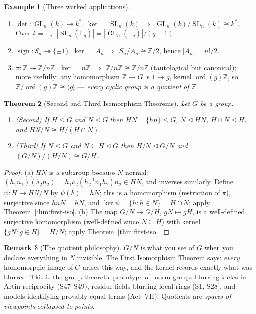 \documentclass[11pt,a4paper]{article}
\newtheorem{theorem}{Theorem}[section]
\theoremstyle{definition}
\newtheorem{example}[theorem]{Example}
\newtheorem{remark}[theorem]{Remark}
\newcommand{\Z}{\mathbb{Z}}
\newcommand{\F}{\mathbb{F}}
\newcommand{\GL}{\operatorname{GL}}
\newcommand{\SL}{\operatorname{SL}}
\newcommand{\ord}{\operatorname{ord}}
\begin{document}
	\begin{example}[Three worked applications]\label{ex:first-iso}
		\begin{enumerate}[label=(\roman*)]
			\item $\det:\GL_n(k)\twoheadrightarrow k^*$, $\ker=\SL_n(k)$ $\Rightarrow$
			$\GL_n(k)/\SL_n(k)\cong k^*$. Over $k=\F_q$: $|\SL_n(\F_q)|=|\GL_n(\F_q)|/(q-1)$.
			\item $\operatorname{sign}:S_n\twoheadrightarrow\{\pm1\}$, $\ker=A_n$ $\Rightarrow$
			$S_n/A_n\cong\Z/2$, hence $|A_n|=n!/2$.
			\item $\pi:\Z\twoheadrightarrow\Z/n\Z$, $\ker=n\Z$ $\Rightarrow$ $\Z/n\Z\cong\Z/n\Z$ (tautological but
			canonical); more usefully: any homomorphism $\Z\to G$ is $1\mapsto g$, kernel $\ord(g)\Z$, so
			$\Z/\ord(g)\Z\cong\langle g\rangle$ --- \emph{every cyclic group is a quotient of $\Z$}.
		\end{enumerate}
	\end{example}
	
	\begin{theorem}[Second and Third Isomorphism Theorems]\label{thm:second-third}
		Let $G$ be a group.
		\begin{enumerate}[label=(\alph*)]
			\item \emph{(Second)} If $H\le G$ and $N\trianglelefteq G$ then $HN=\{hn\}\le G$, $N\trianglelefteq HN$,
			$H\cap N\trianglelefteq H$, and $HN/N\cong H/(H\cap N)$.
			\item \emph{(Third)} If $N\trianglelefteq G$ and $N\subseteq H\trianglelefteq G$ then
			$H/N\trianglelefteq G/N$ and $(G/N)/(H/N)\cong G/H$.
		\end{enumerate}
	\end{theorem}
	\begin{proof}
		(a) $HN$ is a subgroup because $N$ normal: $(h_1n_1)(h_2n_2)=h_1h_2(h_2^{-1}n_1h_2)n_2\in HN$, and
		inverses similarly. Define $\psi:H\to HN/N$ by $\psi(h)=hN$; this is a homomorphism (restriction of
		$\pi$), surjective since $hnN=hN$, and $\ker\psi=\{h:h\in N\}=H\cap N$; apply
		Theorem~\ref{thm:first-iso}. (b) The map $G/N\to G/H$, $gN\mapsto gH$, is a well-defined surjective
		homomorphism (well-defined since $N\subseteq H$) with kernel $\{gN:g\in H\}=H/N$; apply
		Theorem~\ref{thm:first-iso}.
	\end{proof}
	
	\begin{remark}[The quotient philosophy]\label{rem:quotient-philosophy}
		$G/N$ is what you see of $G$ when you declare everything in $N$ invisible. The First Isomorphism
		Theorem says: \emph{every} homomorphic image of $G$ arises this way, and the kernel records exactly
		what was blurred. This is the group-theoretic prototype of: norm groups blurring ideles in Artin
		reciprocity (S47--S49), residue fields blurring local rings (S1, S28), and models identifying
		provably equal terms (Act~VII). Quotients are \emph{spaces of viewpoints collapsed to points}.
	\end{remark}
	
\end{document}
